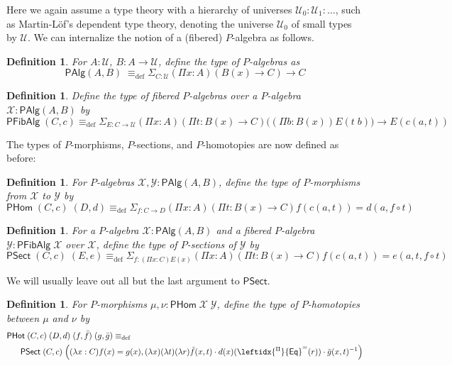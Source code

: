 \documentclass[reqno,10pt,a4paper,oneside]{amsart}
\numberwithin{equation}{section}
\theoremstyle{mythm}
\theoremstyle{mydef}
\newtheorem{definition}[theorem]{Definition}
\theoremstyle{myrmk}
\newcommand{\deq}{\equiv}
\newcommand{\defeq}{\deq_{\mathrm{def}}}
\newcommand{\U}{\mathcal{U}}
\newcommand{\ct}{\cdot}
\newcommand{\funext}{\leftidx{^\Pi}{\mathsf{Eq}}^{=}}
\newcommand{\sm}[1]{\Sigma_{#1}}
\newcommand{\WCell}{\mathsf{PHot}}
\newcommand{\WAlg}{\mathsf{PAlg}}
\newcommand{\WFibAlg}{\mathsf{PFibAlg}}
\newcommand{\WHom}{\mathsf{PHom}}
\newcommand{\WFibHom}{\mathsf{PSect}}
\newcommand{\X}{\mathcal{X}}
\newcommand{\Y}{\mathcal{Y}}
\begin{document}
Here we again assume a type theory with a hierarchy of universes $\U_0 : \U_1 : \ldots$, such as Martin-L{\"o}f's dependent type theory, denoting the universe $\U_0$ of small types by $\U$. We can internalize the notion of a (fibered) $P$-algebra as follows.

\begin{definition}\label{def:WAlg}
For $A:\U$, $B : A \to \U$, define the type of \emph{$P$-algebras} as
\[\WAlg(A,B) \; \defeq \sm{C : \U} (\Pi x:A) (B(x) \to C) \to C \]
\end{definition}

\begin{definition}\label{def:WFibAlg}
Define the type of \emph{fibered $P$-algebras} over a $P$-algebra $\X : \WAlg(A,B)$ by
\[\WFibAlg \; (C,c) \defeq \sm{E : C \to \U} (\Pi x:A) (\Pi t: B(x) \to C) \big((\Pi b:B(x)) E(t \;b) \big) \to E(c(a,t)) \]
\end{definition}

\noindent The types of $P$-morphisms, $P$-sections, and $P$-homotopies are now defined as before:

\begin{definition}\label{def:WHom}
For $P$-algebras $\X,\Y : \WAlg(A,B)$, define the type of \emph{$P$-morphisms} from $\X$ to $\Y$ by
\[ \WHom \; (C,c) \; (D,d) \defeq \sm{f:C\to D} (\Pi x:A) (\Pi t: B(x) \to C) f(c(a,t)) = d(a,f \circ t) \]
\end{definition}

\begin{definition}\label{def:WFibHom}
For a $P$-algebra $\X : \WAlg(A,B)$ and a fibered $P$-algebra $\Y : \WFibAlg \; \X$ over $\X$, define the type of \emph{$P$-sections} of $\Y$ by
\[ \WFibHom \; (C,c) \; (E,e) \defeq \sm{f:(\Pi x:C)E(x)}(\Pi x:A) (\Pi t: B(x) \to C) f(c(a,t)) = e(a,t,f \circ t) \]
\end{definition}
We will usually leave out all but the last argument to $\WFibHom$.

\begin{definition}\label{def:WCell}
For $P$-morphisms $\mu, \nu : \WHom \; \X \; \Y$, define the type of \emph{$P$-homotopies} between $\mu$ and $\nu$ by
\begin{align*} 
& \WCell \; (C,c) \; (D,d) \; (f,\bar{f}) \; (g,\bar{g}) \defeq \\ & \;\;\; \;\;\;\WFibHom \; (C,c) \; \Big((\lambda x:C) f(x) = g(x), (\lambda x) (\lambda t) (\lambda r) \bar{f}(x,t) \ct d(x)(\funext(r)) \ct \bar{g}(x,t)^{-1}\Big)
\end{align*}
\end{definition}
\end{document}
